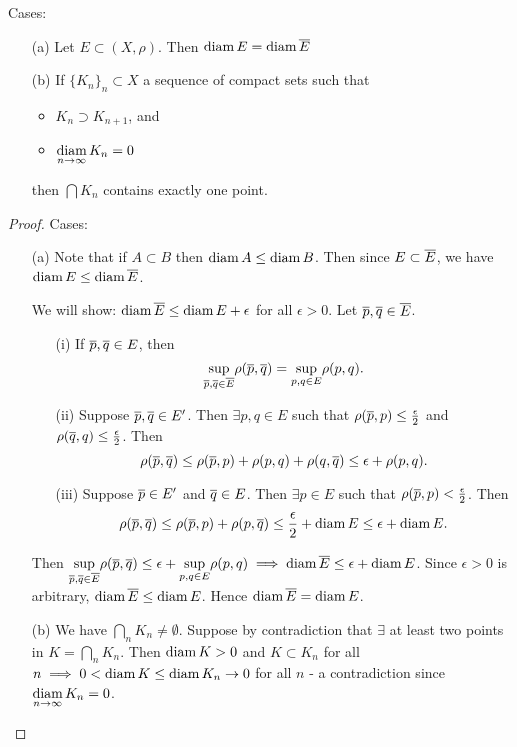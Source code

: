 \documentclass[]{article}
\begin{document}
\begin{theorem}
	Cases:
	\begin{enumerate}
		\item[(a)] Let $E\subset(X,\rho)$. Then $\text{diam}\,E = \text{diam}\,\overline{E}$
		\item[(b)] If $\{K_n\}_n\subset X$ a sequence of compact sets such that
			\begin{itemize}
				\item $K_n\supset K_{n+1}$, and
				\item $\underset{n\rightarrow\infty}{\text{diam}}\, K_n = 0$
			\end{itemize}
			then $\bigcap K_n$ contains exactly one point.
	\end{enumerate}
	\label{thm-3-10}
\end{theorem}
\begin{proof}
	Cases:
	\begin{enumerate}
		\item[(a)] \say{$\geq$}
			Note that if $A\subset B$ then $\text{diam}\,A\leq \text{diam}\,B$.
			Then since $E\subset\overline{E}$, we have \ul{$\text{diam}\,E\leq \text{diam}\,\overline{E}$}.

			\say{$\leq$} We will show: $\text{diam}\,\overline{E}\leq \text{diam}\,E + \epsilon$ for all $\epsilon >0$.
			Let $\overline{p}, \overline{q}\in \overline{E}$. 
			\begin{enumerate}
				\item[(i)] If $\overline{p}, \overline{q}\in E$, then $$\underset{\overline{p},\overline{q}\in \overline{E}}{\sup}\rho(\overline{p},\overline{q}) = \underset{p,q\in E}{\sup}\rho(p,q).$$
				\item[(ii)] Suppose $\overline{p}, \overline{q}\in E'$. Then $\exists p,q\in E$ such that $\rho(\overline{p},p)\leq \frac{\epsilon}{2}$ and $\rho(\overline{q},q)\leq \frac{\epsilon}{2}$.
					Then $$\rho(\overline{p},\overline{q})\leq \rho(\overline{p},p) + \rho(p,q) + \rho(q,\overline{q}) \leq \epsilon + \rho(p,q).$$
				\item[(iii)] Suppose $\overline{p}\in E'$ and $\overline{q}\in E$. Then $\exists p\in E$ such that $\rho(\overline{p}, p) < \frac{\epsilon}{2}$.
					Then $$\rho(\overline{p},\overline{q}) \leq \rho(\overline{p},p) + \rho(p,\overline{q}) \leq \frac{\epsilon}{2} + \text{diam}\,E \leq \epsilon + \text{diam}\,E.$$
			\end{enumerate}
			Then $\underset{\overline{p},\overline{q}\in \overline{E}}{\sup}\rho(\overline{p},\overline{q}) \leq \epsilon + \underset{p,q\in E}{\sup}\rho(p,q) \implies \text{diam}\,\overline{E} \leq \epsilon + \text{diam}\,E$.
			Since $\epsilon > 0$ is arbitrary, \ul{$\text{diam}\,\overline{E}\leq \text{diam}\,E$}.
			Hence $\text{diam}\,\overline{E} = \text{diam}\,E$.

		\item[(b)] We have $\bigcap_n K_n \neq \emptyset$.
			Suppose by contradiction that $\exists$ at least two points in $K = \bigcap_n K_n$.
			Then $\text{diam}\,K> 0$ and $K\subset K_n$ for all $n \implies 0 < \text{diam}\,K \leq \text{diam}\,K_n \rightarrow 0$ for all $n$ - a contradiction since $\underset{n\rightarrow\infty}{\text{diam}}\,K_n = 0$.
	\end{enumerate}
\end{proof}
\end{document}
